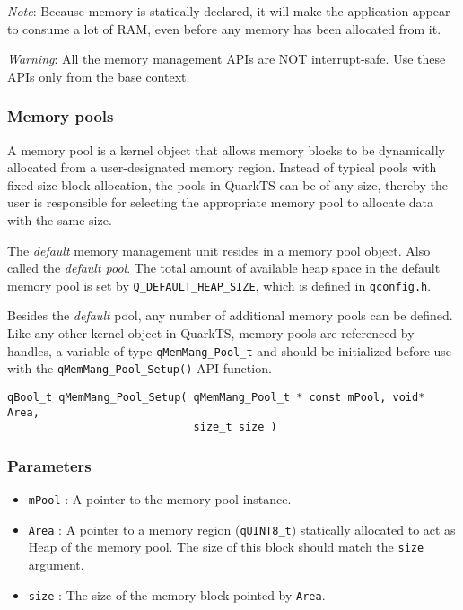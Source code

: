 \begin{tcolorbox}
\ArrowBoldDownRight \textit{Note}: Because memory is statically declared, it will make the application appear to consume a lot of RAM, even before any memory has been allocated from it.
\end{tcolorbox}

\begin{tcolorbox}
\AsteriskBold \textit{Warning}: All the memory management APIs are NOT interrupt-safe. Use these APIs only from the base context.
\end{tcolorbox}

\subsubsection{Memory pools}

A memory pool is a kernel object that allows memory blocks to be dynamically allocated from a user-designated memory region. Instead of typical pools with fixed-size block allocation, the pools in QuarkTS can be of any size, thereby the user is responsible for selecting the appropriate memory pool to allocate data with the same size. 

The \textit{default} memory management unit resides in a memory pool object. Also called the \textit{default pool}. The total amount of available heap space in the default memory pool is set by \lstinline{Q_DEFAULT_HEAP_SIZE}, which is defined in \lstinline{qconfig.h}.

Besides the \textit{default} pool, any number of additional memory pools can be defined. Like any other kernel object in QuarkTS, memory pools are referenced by handles, a variable of type \lstinline{qMemMang_Pool_t}  and should be initialized before use with the \lstinline{qMemMang_Pool_Setup()}  API function. \\

\begin{lstlisting}[style=CStyle]
qBool_t qMemMang_Pool_Setup( qMemMang_Pool_t * const mPool, void* Area, 
                             size_t size )
\end{lstlisting}

\subsubsection*{Parameters}
\begin{itemize}
    \item \lstinline{mPool} : A pointer to the memory pool instance. 
    \item \lstinline{Area} :  A pointer to a memory region (\lstinline{qUINT8_t}) statically allocated to act as Heap of the memory pool. The size of this block should match the \lstinline{size} argument.
    \item \lstinline{size} : The size of the memory block pointed by \lstinline{Area}. 
\end{itemize}

